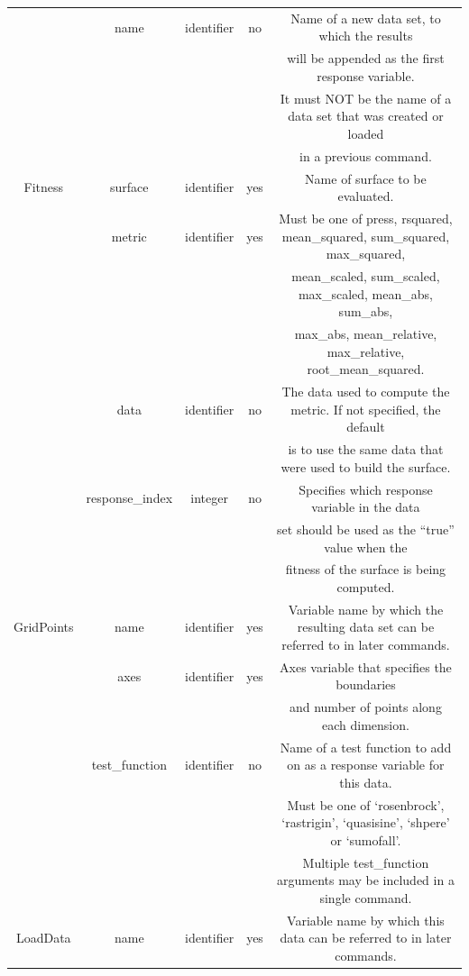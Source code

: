 \documentclass{article}
\begin{document}
\begin{table}
\begin{tabular}{|c|c|c|c|c|}
    \hline
    & name & identifier & no & Name of a new data set, to which the results\\
    & & & & will be appended as the first response variable. \\
    & & & & It must NOT be the name of a data set that was created or
    loaded\\
    & & & & in a previous command.\\
    \hline
    Fitness & surface & identifier & yes & Name of surface to be
    evaluated.\\
    \hline
    & metric & identifier & yes & Must be one of press, rsquared,
    mean\_squared, sum\_squared, max\_squared, \\ 
    & & & & mean\_scaled, sum\_scaled, max\_scaled, mean\_abs, sum\_abs, \\
    & & & & max\_abs, mean\_relative, max\_relative, root\_mean\_squared.\\
    \hline
    & data & identifier & no & The data used to compute the metric.
    If not specified, the default\\
    & & & & is to use the same data that were used to build the
    surface.\\
    \hline
    & response\_index & integer & no & Specifies which response
    variable in the data\\ & & & & set should be used as the ``true'' value when the\\
    & & & & fitness of the surface is being computed.\\
    \hline
    GridPoints & name & identifier & yes & Variable name by which the
    resulting data set can be referred to in later commands.\\
    \hline
    & axes & identifier & yes & Axes variable that specifies the
    boundaries\\
    & & & & and number of points along each dimension.\\
    \hline
    & test\_function & identifier & no & Name of a test function to add on
    as a response variable for this data.\\
    & & & & Must be one of `rosenbrock', `rastrigin', `quasisine',
    `shpere' or `sumofall'.\\
    & & & & Multiple test\_function arguments may be included in a
    single command.\\
    \hline
    LoadData & name & identifier & yes & Variable name by which this
    data can be referred to in later commands.\\
    \hline

\end{tabular}
\end{table}
\end{document}
